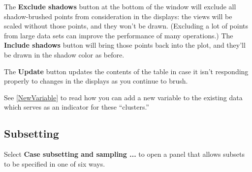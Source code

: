 \documentclass[11pt]{article}
\def\Widget#1{\textbf{#1}}
\begin{document}
The \Widget{Exclude shadows} button at the bottom of the window will
exclude all shadow-brushed points from consideration in the
displays:  the views will be scaled without those points, and they
won't be drawn.  (Excluding a lot of points from large data sets can
improve the performance of many operations.)
The \Widget{Include shadows} button will bring those
points back into the plot, and they'll be drawn in the shadow color
as before.

The \Widget{Update} button updates the contents of the table in case it
isn't responding properly to changes in the displays as you continue
to brush.

See \ref{NewVariable} to read how you can add a new variable to the
existing data which serves as an indicator for these ``clusters.''

\subsection{Subsetting}

Select \Widget{Case subsetting and sampling ...} to open a panel
that allows subsets to be specified in one of six ways.
\end{document}
